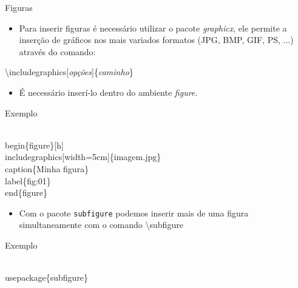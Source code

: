 \begin{frame}{Figuras}
    \begin{itemize}
    \item Para inserir figuras é necessário utilizar o pacote \textit{graphicx}, ele permite a inserção de gráficos nos mais variados formatos (JPG, BMP, GIF, PS, ...) através do comando:
    \end{itemize}
    
    \alert{\textbackslash includegraphics[\textit{opções}]\{\textit{caminho}\}}

    \begin{itemize}
    \item É necessário inserí-lo dentro do ambiente \textit{figure}.
    \end{itemize}

    \begin{exampleblock}{Exemplo}
        \begin{semiverbatim}
\small\\begin\{figure\}[h]
\\includegraphics[width=5cm]\{imagem.jpg\}
\\caption\{Minha figura\}
\\label\{fig:01\}
\\end\{figure\}
\end{semiverbatim}
    \end{exampleblock}

    \begin{itemize}
    \item Com o pacote \verb|subfigure| podemos inserir mais de uma figura simultaneamente com o comando \alert{\textbackslash subfigure}
    \end{itemize}

    \begin{exampleblock}{Exemplo}
    \begin{semiverbatim}
\footnotesize\\usepackage\{subfigure\}


\end{semiverbatim}
\end{exampleblock}
\end{frame}

